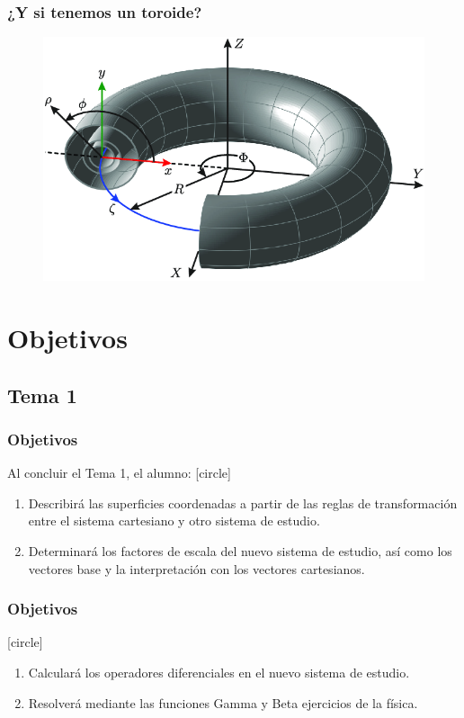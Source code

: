 \documentclass[12pt]{beamer}
\begin{document}
\begin{frame}
\frametitle{¿Y si tenemos un toroide?}
\begin{figure}
    \centering
    \includegraphics[scale=0.4]{Imagenes/Geometria_Toro.png}
\end{figure}
\end{frame}

\section{Objetivos}

\subsection{Tema 1}
\begin{frame}
\frametitle{Objetivos}
Al concluir el Tema 1, el alumno:
[circle]
\begin{enumerate}[<+->]
\item Describirá las superficies coordenadas a partir de las reglas de transformación entre el sistema cartesiano y otro sistema de estudio.
\item Determinará los factores de escala del nuevo sistema de estudio, así como los vectores base y la interpretación con los vectores cartesianos.
\seti
\end{enumerate}
\end{frame}
\begin{frame}
\frametitle{Objetivos}
[circle]
\begin{enumerate}[<+->]
\conti
\item Calculará los operadores diferenciales en el nuevo sistema de estudio.
\item Resolverá mediante las funciones Gamma y Beta ejercicios de la física.
\end{enumerate}
\end{frame}
\end{document}
